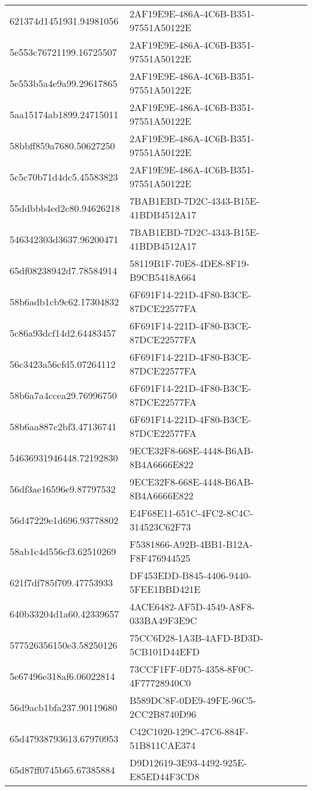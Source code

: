 \begin{tabular}{ll}
621374d1451931.94981056 & 2AF19E9E-486A-4C6B-B351-97551A50122E \\
5e553c76721199.16725507 & 2AF19E9E-486A-4C6B-B351-97551A50122E \\
5e553b5a4e9a99.29617865 & 2AF19E9E-486A-4C6B-B351-97551A50122E \\
5aa15174ab1899.24715011 & 2AF19E9E-486A-4C6B-B351-97551A50122E \\
58bbff859a7680.50627250 & 2AF19E9E-486A-4C6B-B351-97551A50122E \\
5c5c70b71d4dc5.45583823 & 2AF19E9E-486A-4C6B-B351-97551A50122E \\
55ddbbb4ed2c80.94626218 & 7BAB1EBD-7D2C-4343-B15E-41BDB4512A17 \\
546342303d3637.96200471 & 7BAB1EBD-7D2C-4343-B15E-41BDB4512A17 \\
65df08238942d7.78584914 & 58119B1F-70E8-4DE8-8F19-B9CB5418A664 \\
58b6adb1cb9c62.17304832 & 6F691F14-221D-4F80-B3CE-87DCE22577FA \\
5c86a93dcf14d2.64483457 & 6F691F14-221D-4F80-B3CE-87DCE22577FA \\
56c3423a56cfd5.07264112 & 6F691F14-221D-4F80-B3CE-87DCE22577FA \\
58b6a7a4ccea29.76996750 & 6F691F14-221D-4F80-B3CE-87DCE22577FA \\
58b6aa887c2bf3.47136741 & 6F691F14-221D-4F80-B3CE-87DCE22577FA \\
54636931946448.72192830 & 9ECE32F8-668E-4448-B6AB-8B4A6666E822 \\
56df3ae16596e9.87797532 & 9ECE32F8-668E-4448-B6AB-8B4A6666E822 \\
56d47229e1d696.93778802 & E4F68E11-651C-4FC2-8C4C-314523C62F73 \\
58ab1c4d556cf3.62510269 & F5381866-A92B-4BB1-B12A-F8F476944525 \\
621f7df785f709.47753933 & DF453EDD-B845-4406-9440-5FEE1BBD421E \\
640b33204d1a60.42339657 & 4ACE6482-AF5D-4549-A8F8-033BA49F3E9C \\
577526356150e3.58250126 & 75CC6D28-1A3B-4AFD-BD3D-5CB101D44EFD \\
5e67496e318af6.06022814 & 73CCF1FF-0D75-4358-8F0C-4F77728940C0 \\
56d9acb1bfa237.90119680 & B589DC8F-0DE9-49FE-96C5-2CC2B8740D96 \\
65d47938793613.67970953 & C42C1020-129C-47C6-884F-51B811CAE374 \\
65d87ff0745b65.67385884 & D9D12619-3E93-4492-925E-E85ED44F3CD8 \\

\end{tabular}
